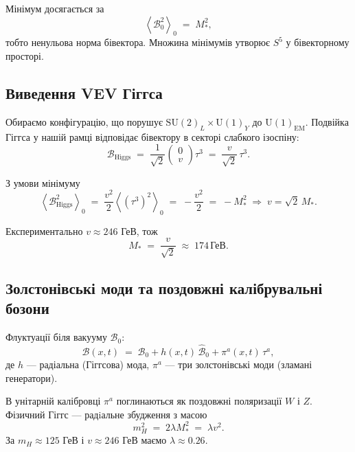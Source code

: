 \documentclass[11pt,a4paper]{article}
\newcommand{\grade}[2]{\left\langle #1 \right\rangle_{#2}}
\newcommand{\scal}[1]{\grade{#1}{0}}
\newcommand{\Biv}{\mathcal{B}}
\newcommand{\SU}{\mathrm{SU}}
\newcommand{\UU}{\mathrm{U}}
\theoremstyle{definition}
\theoremstyle{plain}
\theoremstyle{remark}
\begin{document}
Мінімум досягається за
\begin{equation}
  \scal{\Biv_0^2} \;=\; M_\ast^2,
\end{equation}
тобто ненульова норма бівектора. Множина мінімумів утворює $S^5$ у бівекторному просторі.

\subsection{Виведення VEV Гіггса}

Обираємо конфігурацію, що порушує $\SU(2)_L \times \UU(1)_Y$ до $\UU(1)_{\text{EM}}$. Подвійка Гіггса у нашій рамці відповідає бівектору в секторі слабкого ізоспіну:
\begin{equation}
  \Biv_{\text{Higgs}} \;=\; \frac{1}{\sqrt{2}}\begin{pmatrix} 0 \\ v \end{pmatrix} \tau^3
  \;=\; \frac{v}{\sqrt{2}}\,\tau^3.
\end{equation}

З умови мінімуму
\begin{equation}
  \scal{\Biv_{\text{Higgs}}^2}
  \;=\; \frac{v^2}{2}\scal{(\tau^3)^2}
  \;=\; -\frac{v^2}{2}
  \;=\; -M_\ast^2
  \;\Rightarrow\;
  v = \sqrt{2}\,M_\ast.
\end{equation}

Експериментально $v \approx 246$ ГеВ, тож
\begin{equation}
  \boxed{M_\ast \;=\; \frac{v}{\sqrt{2}} \;\approx\; 174\,\text{ГеВ}.}
  \label{eq:rotor-stiffness}
\end{equation}

\subsection{Золстонівські моди та поздовжні калібрувальні бозони}

Флуктуації біля вакууму $\Biv_0$:
\begin{equation}
  \Biv(x,t) \;=\; \Biv_0 + h(x,t)\,\hat{\Biv}_0 + \pi^a(x,t)\,\tau^a,
\end{equation}
де $h$ — радіальна (Гіггсова) мода, $\pi^a$ — три золстонівські моди (зламані генератори).

В унітарній калібровці $\pi^a$ поглинаються як поздовжні поляризації $W$ і $Z$. Фізичний Гіггс — радiальне збудження з масою
\begin{equation}
  m_H^2 \;=\; 2\lambda M_\ast^2 \;=\; \lambda v^2.
\end{equation}
За $m_H \approx 125$ ГеВ і $v \approx 246$ ГеВ маємо $\lambda \approx 0{.}26$.
\end{document}
